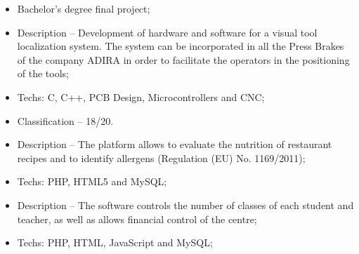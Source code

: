 \documentclass[10pt,a4paper]{altacv}
\begin{document}
\divider

%



\begin{itemize}
  \item Bachelor's degree final project;
  \item Description -- Development of hardware and software for a visual tool localization system. The system can be incorporated in all the Press Brakes of the company ADIRA in order to facilitate the operators in the positioning of the tools;
  \item Techs: C, C++, PCB Design, Microcontrollers and CNC;
  \item Classification -- 18/20.
\end{itemize}

\divider

%



\begin{itemize}
  \item Description -- The platform allows to evaluate the nutrition of restaurant recipes and to identify allergens (Regulation (EU) No. 1169/2011);
  \item Techs: PHP, HTML5 and MySQL;
\end{itemize}

\divider

%



\begin{itemize}
  \item Description -- The software controls the number of classes of each student and teacher, as well as allows financial control of the centre;
  \item Techs: PHP, HTML, JavaScript and MySQL;
\end{itemize}




\divider


\divider

\fi
\end{document}
